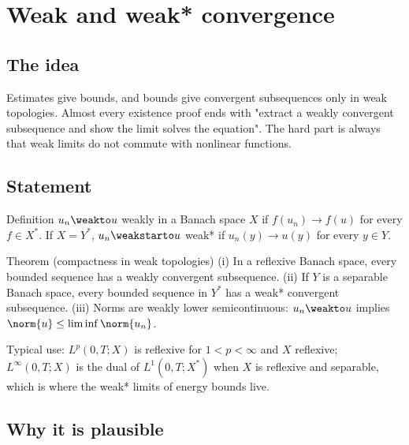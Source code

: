 
\section{Weak and weak* convergence}\label{p:weak-convergence}


\subsection*{The idea}

Estimates give bounds, and bounds give convergent subsequences only in weak topologies. Almost every existence proof ends with "extract a weakly convergent subsequence and show the limit solves the equation". The hard part is always that weak limits do not commute with nonlinear functions.

\subsection*{Statement}

\begin{defnbox}{Definition}
$u_n \weakto u$ weakly in a Banach space $X$ if $f(u_n)\to f(u)$ for every $f \in X^*$. If $X = Y^*$, $u_n \weakstarto u$ weak* if $u_n(y) \to u(y)$ for every $y \in Y$.
\end{defnbox}

\begin{thmbox}{Theorem (compactness in weak topologies)}
(i) In a reflexive Banach space, every bounded sequence has a weakly convergent subsequence. (ii) If $Y$ is a separable Banach space, every bounded sequence in $Y^*$ has a weak* convergent subsequence. (iii) Norms are weakly lower semicontinuous: $u_n \weakto u$ implies $\norm{u} \le \liminf \norm{u_n}$.
\end{thmbox}

Typical use: $L^p(0,T;X)$ is reflexive for $1< p< \infty$ and $X$ reflexive; $L^\infty(0,T;X)$ is the dual of $L^1(0,T;X^*)$ when $X$ is reflexive and separable, which is where the weak* limits of energy bounds live.

\subsection*{Why it is plausible}


